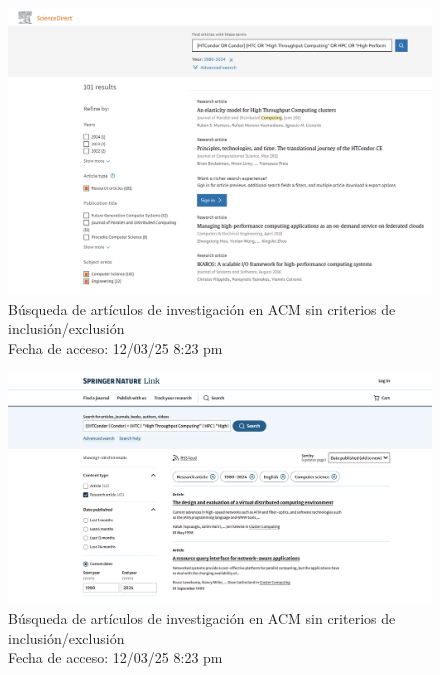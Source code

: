 \FloatBarrier

\begin{figure}[H]
	\centering
	\includegraphics[width=\textwidth,keepaspectratio]{apendices/bases-datos/con-exclusion/science-direct.png}
	\caption{Búsqueda de artículos de investigación en ACM sin criterios de inclusión/exclusión \\
		Fecha de acceso: 12/03/25 8:23 pm
	}\label{fig:busqueda-science-direct-con-exclusion}
\end{figure}

\begin{figure}[H]
	\centering
	\includegraphics[width=\textwidth,keepaspectratio]{apendices/bases-datos/con-exclusion/springer.png}
	\caption{Búsqueda de artículos de investigación en ACM sin criterios de inclusión/exclusión \\
		Fecha de acceso: 12/03/25 8:23 pm
	}\label{fig:busqueda-springer-con-exclusion}
\end{figure}




